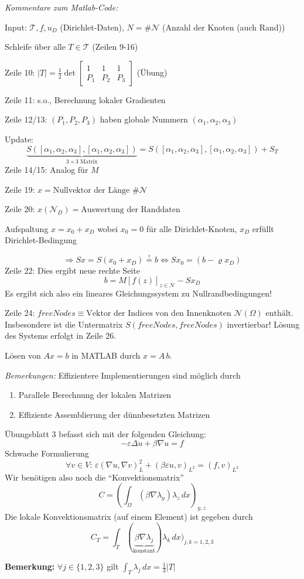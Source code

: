 \documentclass[oneside,a4paper]{amsart}
\begin{document}
\emph{Kommentare zum Matlab-Code:}\par
Input: $\mathcal{T}, f, u_D$ (Dirichlet-Daten), $N = \#\mathcal{N}$ (Anzahl der Knoten (auch Rand))\par
Schleife über alle $T\in\mathcal{T}$ (Zeilen 9-16)\par
Zeile 10: $\vert T\vert = \frac{1}{2} \det \begin{bmatrix}1 & 1 & 1\\ P_1 & P_2 & P_3\end{bmatrix}$ (Übung)\par
Zeile 11: s.o., Berechnung lokaler Gradienten\par
Zeile 12/13: $(P_1,P_2,P_3)$ haben globale Nummern $(\alpha_1,\alpha_2,\alpha_3)$\par
Update: 
\[
	\underbrace{S([\alpha_1,\alpha_2,\alpha_3],[\alpha_1,\alpha_2,\alpha_3])}_{3\times 3\text{ Matrix}} = S([\alpha_1,\alpha_2,\alpha_3],[\alpha_1,\alpha_2,\alpha_3]) + S_T
\]
Zeile 14/15: Analog für $M$\par
Zeile 19: $x = \text{Nullvektor der Länge }\#\mathcal{N}$ \par
Zeile 20: $x(\mathcal{N}_D) = \text{Auswertung der Randdaten}$\par
Aufspaltung $x = x_0 + x_D$ wobei $x_0 = 0$ für alle Dirichlet-Knoten, $x_D$ erfüllt Dirichlet-Bedingung\par
\[
	\Rightarrow Sx = S(x_0+x_D) \overset{!}{=} b \Leftrightarrow Sx_0 = (b-\varrho x_D)
\]
Zeile 22: Dies ergibt neue rechte Seite 
\[
	b = M \left[f(z)\right]_{z\in\mathcal{N}} - Sx_D
\]
Es ergibt sich also ein lineares Gleichungssystem zu  Nullrandbedingungen!\par
Zeile 24: $freeNodes \equiv \text{Vektor der Indices von den Innenknoten } \mathcal{N}(\Omega) \text{ enthält}$. Insbesondere ist die Untermatrix $S(freeNodes,freeNodes)$ invertierbar! Lösung des Systems erfolgt in Zeile 26.\par
Lösen von $Ax = b$ in MATLAB durch $x=A\,b$.\par
\emph{Bemerkungen:} 
Effizientere Implementierungen sind möglich durch
\begin{enumerate}
	\item Parallele Berechnung der lokalen Matrizen
	\item Effiziente Assemblierung der dünnbesetzten Matrizen
\end{enumerate}

Übungsblatt 3 befasst sich mit der folgenden Gleichung:
\[
	-\varepsilon\Delta u + \beta \nabla u = f
\]
Schwache Formulierung
\[
	\forall v\in V:\, \varepsilon(\nabla u,\nabla v)_L^2 + (\beta\varepsilon u,v)_{{L^2}} = (f,v)_{L^2}
\]
Wir benötigen also noch die ``Konvektionsmatrix''
\[
	C = \left(\int_\Omega (\beta\nabla\lambda_y)\lambda_z\, dx\right)_{y,z}
\]
Die lokale Konvektionsmatrix (auf einem Element) ist gegeben durch
\[
	C_T = \int_T(\underbrace{\beta\nabla\lambda_j}_{\text{konstant}})\lambda_k\, dx)_{j,k = 1,2,3}
\]

\textbf{Bemerkung: } $\forall j\in\{1,2,3\}$ gilt $\int_T \lambda_j\,dx = \frac{1}{3}\vert T\vert$
\end{document}
